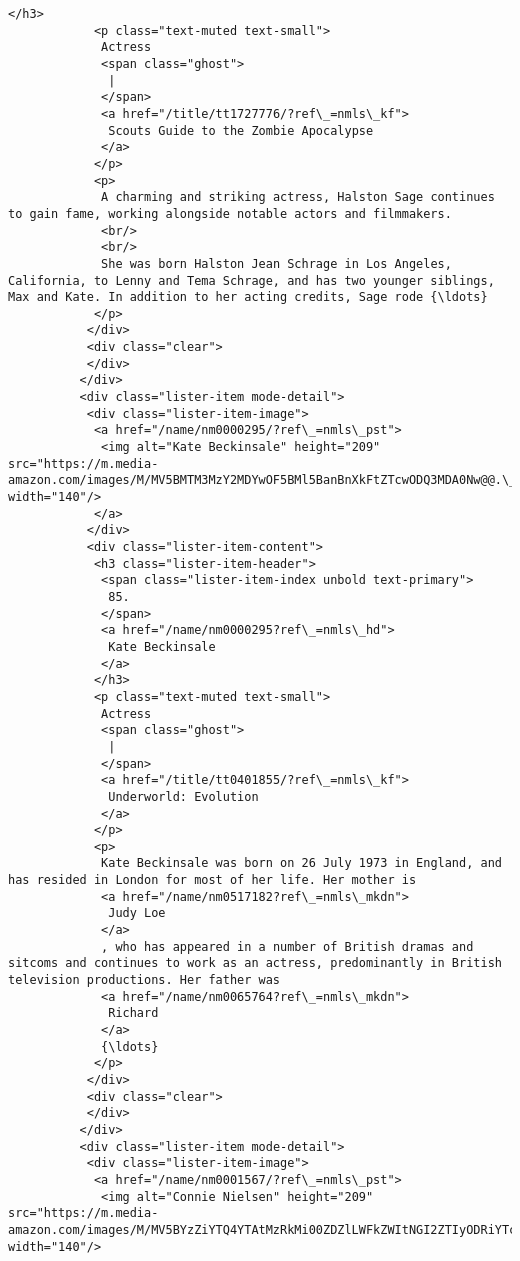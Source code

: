\documentclass[11pt]{article}
\begin{document}
\begin{Verbatim}[commandchars=\\\{\}]
            </h3>
            <p class="text-muted text-small">
             Actress
             <span class="ghost">
              |
             </span>
             <a href="/title/tt1727776/?ref\_=nmls\_kf">
              Scouts Guide to the Zombie Apocalypse
             </a>
            </p>
            <p>
             A charming and striking actress, Halston Sage continues to gain fame, working alongside notable actors and filmmakers.
             <br/>
             <br/>
             She was born Halston Jean Schrage in Los Angeles, California, to Lenny and Tema Schrage, and has two younger siblings, Max and Kate. In addition to her acting credits, Sage rode {\ldots}
            </p>
           </div>
           <div class="clear">
           </div>
          </div>
          <div class="lister-item mode-detail">
           <div class="lister-item-image">
            <a href="/name/nm0000295/?ref\_=nmls\_pst">
             <img alt="Kate Beckinsale" height="209" src="https://m.media-amazon.com/images/M/MV5BMTM3MzY2MDYwOF5BMl5BanBnXkFtZTcwODQ3MDA0Nw@@.\_V1\_UX140\_CR0,0,140,209\_AL\_.jpg" width="140"/>
            </a>
           </div>
           <div class="lister-item-content">
            <h3 class="lister-item-header">
             <span class="lister-item-index unbold text-primary">
              85.
             </span>
             <a href="/name/nm0000295?ref\_=nmls\_hd">
              Kate Beckinsale
             </a>
            </h3>
            <p class="text-muted text-small">
             Actress
             <span class="ghost">
              |
             </span>
             <a href="/title/tt0401855/?ref\_=nmls\_kf">
              Underworld: Evolution
             </a>
            </p>
            <p>
             Kate Beckinsale was born on 26 July 1973 in England, and has resided in London for most of her life. Her mother is
             <a href="/name/nm0517182?ref\_=nmls\_mkdn">
              Judy Loe
             </a>
             , who has appeared in a number of British dramas and sitcoms and continues to work as an actress, predominantly in British television productions. Her father was
             <a href="/name/nm0065764?ref\_=nmls\_mkdn">
              Richard
             </a>
             {\ldots}
            </p>
           </div>
           <div class="clear">
           </div>
          </div>
          <div class="lister-item mode-detail">
           <div class="lister-item-image">
            <a href="/name/nm0001567/?ref\_=nmls\_pst">
             <img alt="Connie Nielsen" height="209" src="https://m.media-amazon.com/images/M/MV5BYzZiYTQ4YTAtMzRkMi00ZDZlLWFkZWItNGI2ZTIyODRiYTc4XkEyXkFqcGdeQXVyMjUzMjc2MjE@.\_V1\_UY209\_CR8,0,140,209\_AL\_.jpg" width="140"/>

\end{Verbatim}
\end{document}
